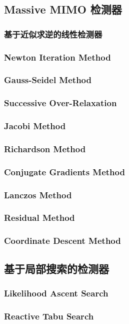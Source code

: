 \subsection{Massive MIMO 检测器}
\subsubsection{基于近似求逆的线性检测器}
\subsubsection{Newton Iteration Method}
\subsubsection{Gauss-Seidel Method}
\subsubsection{Successive Over-Relaxation}
\subsubsection{Jacobi Method}
\subsubsection{Richardson Method}
\subsubsection{Conjugate Gradients Method}
\subsubsection{Lanczos Method}
\subsubsection{Residual Method}
\subsubsection{Coordinate Descent Method}
\subsection{基于局部搜索的检测器}
\subsubsection{Likelihood Ascent Search}
\subsubsection{Reactive Tabu Search}
